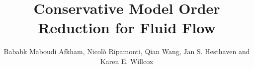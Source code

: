 \documentclass[graybox]{svmult}
\begin{document}
\title*{Conservative Model Order Reduction for Fluid Flow}
\author{Bababk Maboudi Afkham, Nicol\`o Ripamonti, Qian Wang, Jan S. Hesthaven and Karen E. Willcox}
%
%
\maketitle


\end{document}
